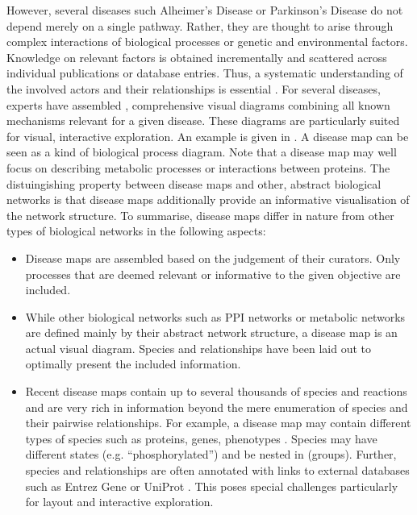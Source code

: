 \documentclass[
	fontsize=10pt, %
	twoside=true, %
	secnumdepth=1, %
  toc=indentunnumbered %
]{kaobook}
\begin{document}
However, several diseases such Alheimer's Disease or Parkinson's Disease do not depend
merely on a single pathway. Rather, they are thought to arise through complex
interactions of biological processes or genetic and environmental factors.
Knowledge on relevant factors is obtained incrementally and scattered across
individual publications or database entries.
Thus, a systematic understanding of the involved actors and their
relationships is essential
\cite{ostaszewski_CommunitydrivenRoadmapIntegrated_2019,
  mazein_SystemsMedicineDisease_2018}.
% 
For several diseases, experts have assembled , comprehensive
visual diagrams combining all known mechanisms relevant for a given disease.
These diagrams are particularly suited for visual, interactive exploration. An
example is given in . A disease map can be
seen as a kind of biological process diagram. Note that a disease map may well
focus on describing metabolic processes or interactions between proteins. The
distuingishing property between disease maps and other, abstract biological
networks is that disease maps additionally provide an informative visualisation
of the network structure.
To summarise, disease maps differ in nature from other types of biological
networks in the following aspects:
\begin{itemize}
\item Disease maps are assembled based on the judgement of their curators. Only
  processes that are deemed relevant or informative to the given objective are
  included.
\item While other biological networks such as PPI networks or metabolic networks
  are defined mainly by their abstract network structure, a disease map is an
  actual visual diagram. Species and relationships have been laid out to
  optimally present the included information.
\item
  Recent disease maps contain up to several thousands of species and reactions and
  are very rich in information beyond the mere enumeration of species and their
  pairwise relationships. For example, a disease map may contain different types
  of species such as proteins, genes, phenotypes \etc. Species may have
  different states (e.g. ``phosphorylated'') and be nested in 
  (groups). Further, species and relationships are often
  annotated with links to external databases such as Entrez Gene
  \cite{maglott_EntrezGeneGenecentered_2005} or UniProt
  \cite{theuniprotconsortium_UniProtUniversalProtein_2021}.
  This poses special challenges particularly for layout and
  interactive exploration. 
\end{itemize}
\end{document}
